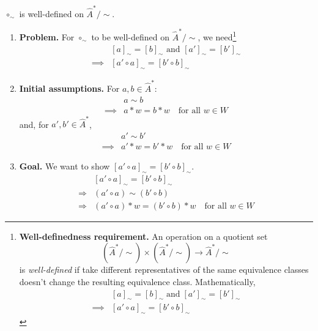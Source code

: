\begin{propositionE}
    \label{prp:circ_sim_well_defined}
    $\circ_{\sim}$ is well-defined on $\hat{A}^{\ast}/\sim$.
\end{propositionE}
\begin{proofE}
\begin{enumerate}
    \item \textbf{Problem.}
    For $\circ_{\sim}$ to be well-defined on $\hat{A}^{*}/\sim$, we need\footnote{
        \textbf{Well-definedness requirement.}
        An operation on a quotient set
        \begin{equation}
            (\hat{A}^{*}/\sim) \times (\hat{A}^{*}/\sim) \to \hat{A}^{*}/\sim
        \end{equation}
        is \emph{well-defined} if take different representatives of the same equivalence classes doesn't change the resulting equivalence class.
        Mathematically,
        \begin{equation}
        \begin{aligned}
            & [a]_{\sim} = [b]_{\sim} \; \text{and} \; [a']_{\sim} = [b']_{\sim} \\
            \implies & [a' \circ a]_{\sim} = [b' \circ b]_{\sim}
        \end{aligned}
        \end{equation}
    }
    \begin{equation}
    \begin{aligned}
        & [a]_{\sim} = [b]_{\sim} \text{ and } [a']_{\sim} = [b']_{\sim} \\
        \implies & [a' \circ a]_{\sim} = [b' \circ b]_{\sim}
    \end{aligned}
    \end{equation}

    \item \textbf{Initial assumptions.}
    For $a, b \in \hat{A}^{\ast}$:
    \begin{align}
        & a \sim b \\
        \implies & a \ast w = b \ast w \quad \text{for all } w \in W
    \end{align}
    and, for $a', b' \in \hat{A}^{\ast}$,
    \begin{align}
        & a' \sim b' \\
        \implies & a' \ast w = b' \ast w \quad \text{for all } w \in W
    \end{align}

    \item \textbf{Goal.}
    We want to show $[a' \circ a]_{\sim} = [b' \circ b]_{\sim}$.
    \begin{align}
                    & [a' \circ a]_{\sim} = [b' \circ b]_{\sim}                               \\
      \Rightarrow{} & (a' \circ a) \sim (b' \circ b)                                          \\
      \Rightarrow{} & (a' \circ a) \ast w = (b' \circ b) \ast w \quad \text{for all } w \in W
    \end{align}


\end{enumerate}
\end{proofE}
